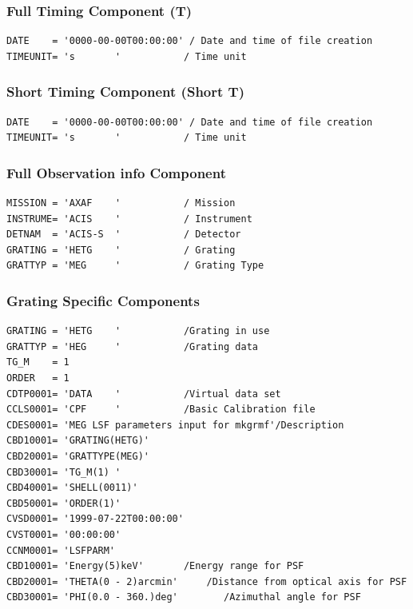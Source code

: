 \documentclass[twoside]{article}
\begin{document}
\subsubsection{Full Timing Component (T)}

\begin{verbatim}
DATE    = '0000-00-00T00:00:00' / Date and time of file creation
TIMEUNIT= 's       '           / Time unit
\end{verbatim}

\subsubsection{Short Timing Component (Short T)}

\begin{verbatim}
DATE    = '0000-00-00T00:00:00' / Date and time of file creation
TIMEUNIT= 's       '           / Time unit
\end{verbatim}

\subsubsection{Full Observation info Component}

\begin{verbatim}
MISSION = 'AXAF    '           / Mission
INSTRUME= 'ACIS    '           / Instrument
DETNAM  = 'ACIS-S  '           / Detector
GRATING = 'HETG    '           / Grating
GRATTYP = 'MEG     '           / Grating Type  
\end{verbatim}



\subsubsection{Grating Specific Components}
\begin{verbatim}
GRATING = 'HETG    '           /Grating in use
GRATTYP = 'HEG     '           /Grating data
TG_M    = 1
ORDER   = 1
CDTP0001= 'DATA    '           /Virtual data set
CCLS0001= 'CPF     '           /Basic Calibration file
CDES0001= 'MEG LSF parameters input for mkgrmf'/Description
CBD10001= 'GRATING(HETG)'
CBD20001= 'GRATTYPE(MEG)'
CBD30001= 'TG_M(1) '
CBD40001= 'SHELL(0011)'
CBD50001= 'ORDER(1)'
CVSD0001= '1999-07-22T00:00:00'
CVST0001= '00:00:00'
CCNM0001= 'LSFPARM'
CBD10001= 'Energy(5)keV'       /Energy range for PSF
CBD20001= 'THETA(0 - 2)arcmin'     /Distance from optical axis for PSF
CBD30001= 'PHI(0.0 - 360.)deg'        /Azimuthal angle for PSF

\end{verbatim}

%

\end{document}
